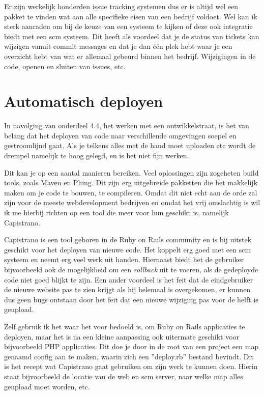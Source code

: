 Er zijn werkelijk honderden issue tracking systemen\cite{issuetracking} dus er is altijd wel een pakket te vinden wat aan alle specifieke eisen van een bedrijf voldoet. Wel kan ik sterk aanraden om bij de keuze van een systeem te kijken of deze ook integratie biedt met een {\sc scm} systeem. Dit heeft als voordeel dat je de status van tickets kan wijzigen vanuit commit messages en dat je dan \'{e}\'{e}n plek hebt waar je een overzicht hebt van wat er allemaal gebeurd binnen het bedrijf. Wijzigingen in de code, openen en sluiten van issues, etc.

\section{Automatisch deployen}

In navolging van onderdeel 4.4, het werken met een ontwikkelstraat, is het van belang dat het deployen van code naar verschillende omgevingen soepel en gestroomlijnd gaat. Als je telkens alles met de hand moet uploaden etc wordt de drempel namelijk te hoog gelegd, en is het niet fijn werken.

Dit kan je op een aantal manieren bereiken. Veel oplossingen zijn zogeheten build tools, zoals Maven\cite{maven} en Phing\cite{phing}. Dit zijn erg uitgebreide pakketten die het makkelijk maken om je code te bouwen, te compileren. Omdat dit niet echt aan de orde zal zijn voor de meeste webdevelopment bedrijven en omdat het vrij omslachtig is wil ik me hierbij richten op een tool die meer voor hun geschikt is, namelijk Capistrano\cite{capistrano}.

Capistrano is een tool geboren in de Ruby on Rails community en is bij uitstek geschikt voor het deployen van nieuwe code. Het koppelt erg goed met een {\sc scm} systeem en neemt erg veel werk uit handen. Hiernaast biedt het de gebruiker bijvoorbeeld ook de mogelijkheid om een \emph{rollback} uit te voeren, als de gedeployde code niet goed blijkt te zijn. Een ander voordeel is het feit dat de eindgebruiker de nieuwe website pas te zien krijgt als hij helemaal is overgekomen, er kunnen dus geen bugs ontstaan door het feit dat een nieuwe wijziging pas voor de helft is geupload.

Zelf gebruik ik het waar het voor bedoeld is, om Ruby on Rails applicaties te deployen, maar het is na een kleine aanpassing ook uitermate geschikt voor bijvoorbeeld PHP applicaties. Dit doe je door in de root van een project een map genaamd config aan te maken, waarin zich een ''deploy.rb'' bestand bevindt. Dit is het recept wat Capistrano gaat gebruiken om zijn werk te kunnen doen. Hierin staat bijvoorbeeld de locatie van de web en {\sc scm} server, naar welke map alles geupload moet worden, etc.

